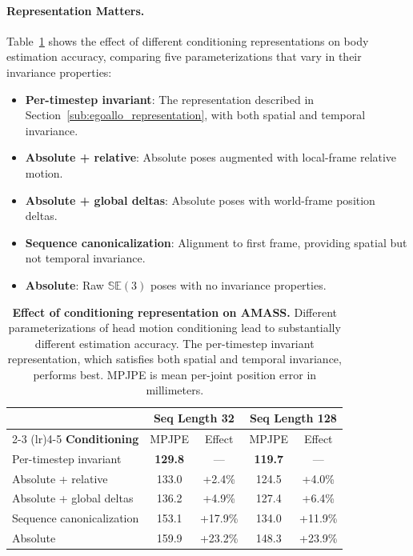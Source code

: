 \paragraph{Representation Matters.}
Table~\ref{tab:egoallo_cond_ablation} shows the effect of different
conditioning representations on body estimation accuracy, comparing
five parameterizations that vary in their invariance properties:
\begin{itemize}
    \item \textbf{Per-timestep invariant}: The representation
        described in Section~\ref{sub:egoallo_representation}, with
        both spatial and temporal invariance.
    \item \textbf{Absolute + relative}: Absolute poses augmented with
        local-frame relative motion.
    \item \textbf{Absolute + global deltas}: Absolute poses with
        world-frame position deltas.
    \item \textbf{Sequence canonicalization}: Alignment to first
        frame, providing spatial but not temporal invariance.
    \item \textbf{Absolute}: Raw $\mathbb{SE}(3)$ poses with no invariance properties.
\end{itemize}

\begin{table}[t]
    \centering
    \caption{\textbf{Effect of conditioning representation on AMASS.}
        Different parameterizations of head motion conditioning lead to
        substantially different estimation accuracy. The per-timestep
        invariant representation, which satisfies both spatial and
        temporal invariance, performs best. MPJPE is mean per-joint
    position error in millimeters.}
    \label{tab:egoallo_cond_ablation}
    \small
    \begin{tabular}{lcccc}
        \toprule
        & \multicolumn{2}{c}{\textbf{Seq Length 32}} &
        \multicolumn{2}{c}{\textbf{Seq Length 128}} \\
        \cmidrule(lr){2-3} \cmidrule(lr){4-5}
        \textbf{Conditioning} & MPJPE & Effect & MPJPE & Effect \\
        \midrule
        Per-timestep invariant & \textbf{129.8} & --- & \textbf{119.7} & --- \\
        Absolute + relative & 133.0 & +2.4\% & 124.5 & +4.0\% \\
        Absolute + global deltas & 136.2 & +4.9\% & 127.4 & +6.4\% \\
        Sequence canonicalization & 153.1 & +17.9\% & 134.0 & +11.9\% \\
        Absolute & 159.9 & +23.2\% & 148.3 & +23.9\% \\
        \bottomrule
    \end{tabular}
\end{table}

